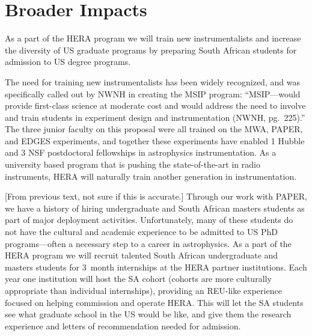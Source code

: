 \documentclass[preprint]{aastex}
\begin{document}
\vspace{-0.25in}
\section{Broader Impacts}
\label{BIsec}
As a part of the HERA program we will train new instrumentalists and increase the diversity of US graduate programs by preparing South African students for admission to US degree programs.

The need for training new instrumentalists has been widely recognized, and was specifically called out by NWNH in creating the MSIP program: ``MSIP---would provide first-class science at moderate cost and would address the need to involve and train students in experiment design and instrumentation (NWNH, pg.\ 225).'' The three junior faculty on this proposal were all trained on the MWA, PAPER, and EDGES experiments, and together these experiments have enabled 1 Hubble and 3 NSF postdoctoral fellowships in astrophysics instrumentation. As a university based program that is pushing the state-of-the-art in radio instruments, HERA will naturally train another generation in instrumentation.

[From previous text, not sure if this is accurate.] Through our work with PAPER, we have a history of hiring undergraduate and South African masters students as part of major deployment activities. Unfortunately, many of these students do not have the cultural and academic experience to be admitted to US PhD programs---often a necessary step to a career in astrophysics. As a part of the HERA program we will recruit talented South African undergraduate and masters students for 3~month internships at the HERA partner institutions. Each year one institution will host the SA cohort (cohorts are more culturally appropriate than individual internships), providing an REU-like experience focused on helping commission and operate HERA. This will let the SA students see what graduate school in the US would be like, and give them the research experience and letters of recommendation needed for admission.
\end{document}
